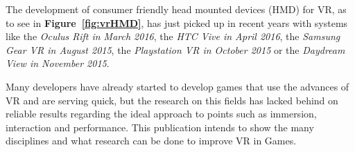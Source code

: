 The development of consumer friendly head mounted devices (HMD) for VR, as to see in \textbf{Figure~\ref{fig:vrHMD}}, has just picked up in recent years with systems like the \textit{Oculus Rift in March 2016}, the \textit{HTC Vive in April 2016}, the \textit{Samsung Gear VR in August 2015}, the \textit{Playstation VR in October 2015} or the \textit{Daydream View in November 2015}. 

Many developers have already started to develop games that use the advances of VR and are serving quick, but the research on this fields has lacked behind on reliable results regarding the ideal approach to points such as immersion, interaction and performance. This publication intends to show the many disciplines and what research can be done to improve VR in Games.


